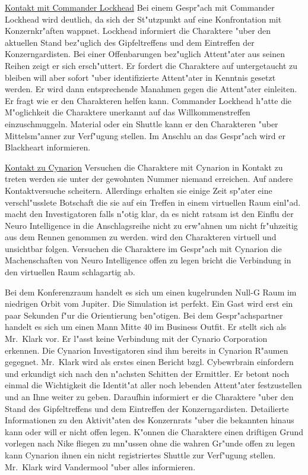 \underline{Kontakt mit Commander Lockhead} Bei einem Gespr"ach mit Commander Lockhead wird deutlich, da\3 sich der St"utzpunkt auf eine Konfrontation mit Konzernkr"aften wappnet. Lockhead informiert die Charaktere "uber den aktuellen Stand bez"uglich des Gipfeltreffens und dem Eintreffen der Konzerngardisten. Bei einer Offenbarungen bez"uglich Attent"ater aus seinen Reihen zeigt er sich ersch"uttert. Er fordert die Charaktere auf untergetaucht zu bleiben will aber sofort "uber identifizierte Attent"ater in Kenntnis gesetzt werden. Er wird dann entsprechende Ma\3nahmen gegen die Attent"ater einleiten. Er fragt wie er den Charakteren helfen kann. Commander Lockhead h"atte die M"oglichkeit die Charaktere unerkannt auf das Willkommenstreffen einzuschmuggeln. Material oder ein Shuttle kann er den Charakteren "uber Mittelsm"anner zur Verf"ugung stellen. Im Anschlu\3 an das Gespr"ach wird er Blackheart informieren.

\underline{Kontakt zu Cynarion} Versuchen die Charaktere mit Cynarion in Kontakt zu treten werden sie unter der gewohnten Nummer niemand erreichen. Auf andere Kontaktversuche scheitern. Allerdings erhalten sie einige Zeit sp"ater eine verschl"usslete Botschaft die sie auf ein Treffen in einem virtuellen Raum einl"ad. \xl{} macht den Investigatoren falls n"otig klar, da\3 es nicht ratsam ist den Einflu\3 der Neuro Intelligence in die Anschlagsreihe nicht zu erw"ahnen um nicht fr"uhzeitig aus dem Rennen genommen zu werden. \xl{} wird den Charakteren virtuell und unsichtbar folgen. Versuchen die Charaktere im Gespr"ach mit Cynarion die Machenschaften von Neuro Intelligence offen zu legen bricht die Verbindung in den virtuellen Raum schlagartig ab. 

Bei dem Konferenzraum handelt es sich um einen kugelrunden Null-G Raum im niedrigen Orbit vom Jupiter. Die Simulation ist perfekt. Ein Gast wird erst ein paar Sekunden f"ur die Orientierung ben"otigen. Bei dem Gespr"achspartner handelt es sich um einen Mann Mitte 40 im Business Outfit. Er stellt sich als Mr.~Klark vor. Er l"asst keine Verbindung mit der Cynario Corporation erkennen. Die Cynarion Investigatoren sind ihm bereits in Cynarion R"aumen gegegnet. Mr.~Klark wird als erstes einen Bericht bzgl. Cybewrbrain einfordern und erkundigt sich nach den n"achsten Schitten der Ermittler. Er betont noch einmal die Wichtigkeit die Identit"at aller noch lebenden Attent"ater festzustellen und an Ihne weiter zu geben. Daraufhin informiert er die Charaktere "uber den Stand des Gipfeltreffens und dem Eintreffen der Konzerngardisten. Detailierte Informationen zu den Aktivit"aten des Konzernrats "uber die bekannten hinaus kann oder will er nicht offen legen. K"onnen die Charaktere einen driftigen Grund vorlegen nach Nike fliegen zu mn"ussen ohne die wahren Gr"unde offen zu legen kann Cynarion ihnen ein nicht registriertes Shuttle zur Verf"ugung stellen. Mr.~Klark wird Vandermool "uber alles informieren.

